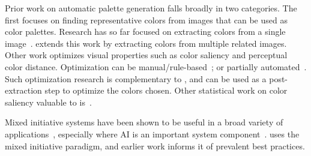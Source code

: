 Prior work  on automatic palette generation falls broadly in two categories. The first focuses on finding representative  colors from images that can be used as color palettes. Research has so far focused on extracting colors from a single image~\cite{morse2007image}. \system extends this work by extracting colors from multiple related images. Other work optimizes visual properties such as color saliency and perceptual color distance. Optimization can be manual/rule-based~\cite{brewer1999color}; or partially automated~\cite{healey1996choosing, zeileis2009RGBland}. Such optimization research is complementary to \system, and can be used as a post-extraction step to optimize the colors chosen. Other statistical work on color saliency valuable to \system is~\cite{chuang2008probabilistic}. 

Mixed initiative systems have been shown to be useful in a broad variety of applications~\cite{hearst1999mixed}, especially  where AI is an important system component~\cite{healey2008visual}. \system uses the mixed initiative paradigm, and earlier work  informs it of prevalent best practices.
